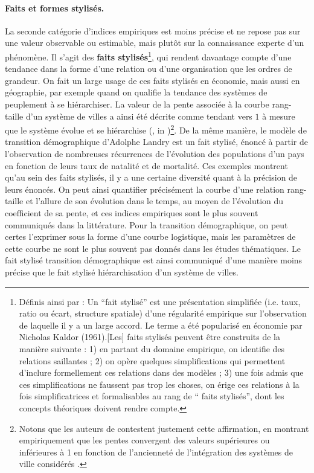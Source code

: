\paragraph{Faits et formes stylisés.}
La seconde catégorie d'indices empiriques est moins précise et ne repose pas sur une valeur observable ou estimable, mais plutôt sur la connaissance experte d'un phénomène.
Il s'agit des \og \textbf{faits stylisés}\fg{}\footnote{
	Définis ainsi par \autocite{livet2014diversite}: \og
	Un ``fait stylisé'' est une présentation simplifiée (i.e. taux, ratio ou écart, structure spatiale) d'une régularité empirique sur l'observation de laquelle il y a un large accord.
	Le terme a été popularisé en économie par Nicholas Kaldor (1961).[Les] faits stylisés peuvent être construits de la manière suivante :
	1) en partant du domaine empirique, on identifie des relations saillantes ;
	2) on opère quelques simplifications qui permettent d'inclure formellement ces relations dans des modèles ;
	3) une fois admis que ces simplifications ne faussent pas trop les choses, on érige ces relations à la fois simplificatrices et formalisables au rang de `` faits stylisés'', dont les concepts théoriques doivent rendre compte.\fg{}
}, qui rendent davantage compte d'une tendance dans la forme d'une relation ou d'une organisation que les ordres de grandeur.
On fait un large usage de ces faits stylisés en économie, mais aussi en géographie, par exemple quand on qualifie la tendance des systèmes de peuplement à se hiérarchiser.
La valeur de la pente associée à la courbe rang-taille d'un système de villes a ainsi été décrite comme tendant vers $1$ à mesure que le système évolue et se hiérarchise (\cite{berry_city_2012}, in \cite[\S9]{pumain_multilevel_2015})\footnote{
	Notons que les auteurs de \textcite{pumain_multilevel_2015} contestent justement cette affirmation, en montrant empiriquement que les pentes convergent des valeurs supérieures ou inférieures à 1 en fonction de l'ancienneté de l'intégration des systèmes de ville considérés \autocite{cura_old_2017}.
}.
De la même manière, le modèle de transition démographique d'Adolphe Landry est un fait stylisé, énoncé à partir de l'observation de nombreuses récurrences de l'évolution des populations d'un pays en fonction de leurs taux de natalité et de mortalité.
Ces exemples montrent qu'au sein des faits stylisés, il y a une certaine diversité quant à la précision de leurs énoncés.
On peut ainsi quantifier précisément la courbe d'une relation rang-taille et l'allure de son évolution dans le temps, au moyen de l'évolution du coefficient de sa pente, et ces indices empiriques sont le plus souvent communiqués dans la littérature.
Pour la transition démographique, on peut certes l'exprimer sous la forme d'une courbe logistique, mais les paramètres de cette courbe ne sont le plus souvent pas donnés dans les études thématiques.
Le fait stylisé \og transition démographique\fg{} est ainsi communiqué d'une manière moins précise que le fait stylisé \og hiérarchisation d'un système de villes\fg{}.

